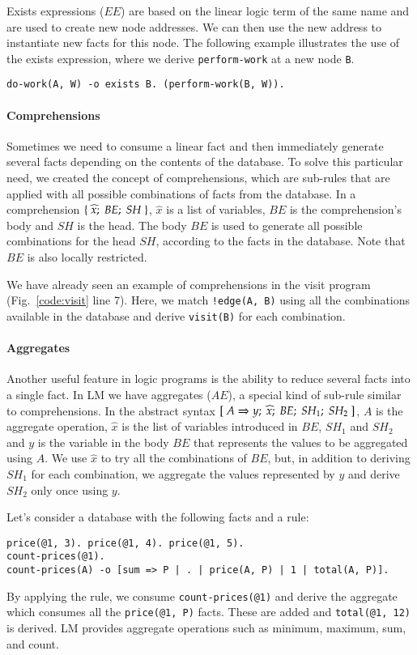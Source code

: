 Exists expressions ($EE$) are based on the linear logic term of the same name and are used to create new node addresses.
We can then use the new address to instantiate new facts for this node.  
The following example illustrates the use of the exists expression, where we derive
\texttt{perform-work} at a new node \texttt{B}.

{\small
\begin{Verbatim}
do-work(A, W) -o exists B. (perform-work(B, W)).
\end{Verbatim}
}

\paragraph{Comprehensions}

Sometimes we need to consume a linear fact and then immediately generate several facts depending on
the contents of the database. To solve this particular need, we created the concept of comprehensions, which are
sub-rules that are applied with all possible combinations of facts from the database. In a comprehension $\{ \; \widehat{x}; \; BE; \; SH \; \}$, $\widehat{x}$ is a list of variables, $BE$ is the comprehension's body and $SH$ is the head.
The body $BE$ is used to generate all possible combinations for the head $SH$, according to the facts
in the database. Note that $BE$ is also locally restricted.

We have already seen an example of comprehensions in the visit program (Fig.~\ref{code:visit} line 7).
Here, we match \texttt{!edge(A, B)} using all the combinations available in the database and derive \texttt{visit(B)}
for each combination.

\paragraph{Aggregates}

Another useful feature in logic programs is the ability to reduce several facts into a single fact.
In LM we have aggregates ($AE$), a special kind of sub-rule similar to comprehensions.
In the abstract syntax $[\; A \Rightarrow y; \; \widehat{x}; \; BE; \; SH_1; \; SH_2 \;]$, $A$ is the aggregate operation, $\widehat{x}$ is the list of variables
introduced in $BE$, $SH_1$ and $SH_2$ and $y$ is the variable in the body
$BE$ that represents the values to be aggregated using $A$.
We use $\widehat{x}$ to try all the combinations of $BE$, but, in addition to deriving $SH_1$ for each combination,
we aggregate the values represented by $y$ and derive $SH_2$ only once using $y$.

Let's consider a database with the following facts and a rule:

{\small
\begin{Verbatim}
price(@1, 3). price(@1, 4). price(@1, 5).
count-prices(@1).
count-prices(A) -o [sum => P | . | price(A, P) | 1 | total(A, P)].
\end{Verbatim}
}

By applying the rule, we consume \texttt{count-prices(@1)} and
derive the aggregate which consumes all the \texttt{price(@1, P)} facts.
These are added and \texttt{total(@1,~12)} is derived.
LM provides aggregate operations such as minimum, maximum, sum, and count.
